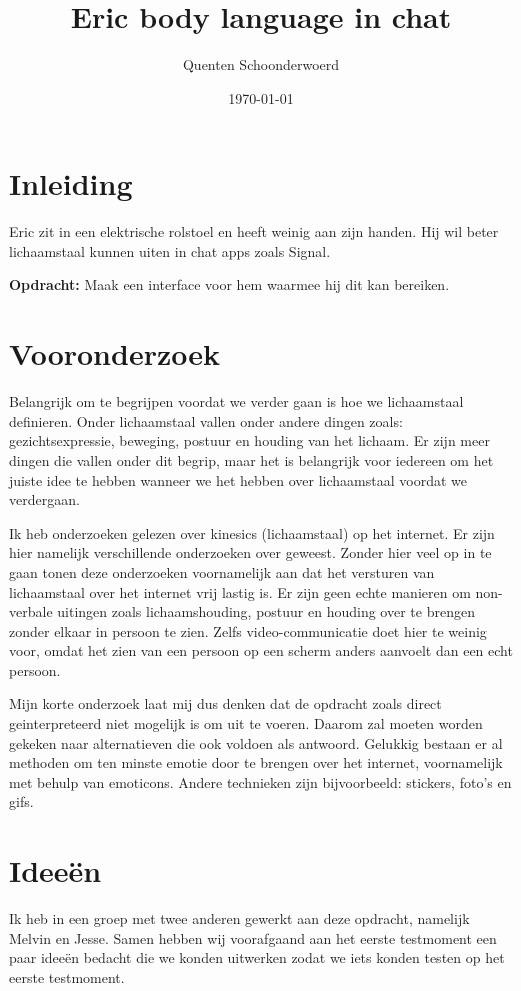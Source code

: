 \documentclass[12pt]{article}
\title{Eric body language in chat}
\author{Quenten Schoonderwoerd}
\date{\today}
\begin{document}
\maketitle

\section{Inleiding}

Eric zit in een elektrische rolstoel en heeft weinig aan zijn handen.
Hij wil beter lichaamstaal kunnen uiten in chat apps zoals Signal.

\textbf{Opdracht:}
Maak een interface voor hem waarmee hij dit kan bereiken.

\section{Vooronderzoek}

Belangrijk om te begrijpen voordat we verder gaan is hoe we lichaamstaal definieren.
Onder lichaamstaal vallen onder andere dingen zoals: gezichtsexpressie, beweging, postuur en houding van het lichaam.
Er zijn meer dingen die vallen onder dit begrip, maar het is belangrijk voor iedereen om het juiste idee te hebben wanneer we het hebben over lichaamstaal voordat we verdergaan.

Ik heb onderzoeken gelezen over kinesics (lichaamstaal) op het internet.
Er zijn hier namelijk verschillende onderzoeken over geweest.
Zonder hier veel op in te gaan tonen deze onderzoeken voornamelijk aan dat het versturen van lichaamstaal over het internet vrij lastig is.
Er zijn geen echte manieren om non-verbale uitingen zoals lichaamshouding, postuur en houding over te brengen zonder elkaar in persoon te zien.
Zelfs video-communicatie doet hier te weinig voor, omdat het zien van een persoon op een scherm anders aanvoelt dan een echt persoon.

Mijn korte onderzoek laat mij dus denken dat de opdracht zoals direct geinterpreteerd niet mogelijk is om uit te voeren.
Daarom zal moeten worden gekeken naar alternatieven die ook voldoen als antwoord.
Gelukkig bestaan er al methoden om ten minste emotie door te brengen over het internet, voornamelijk met behulp van emoticons.
Andere technieken zijn bijvoorbeeld: stickers, foto's en gifs.

\clearpage\section{Ideeën}
Ik heb in een groep met twee anderen gewerkt aan deze opdracht, namelijk Melvin en Jesse.
Samen hebben wij voorafgaand aan het eerste testmoment een paar ideeën bedacht die we konden uitwerken zodat we iets konden testen op het eerste testmoment.
\end{document}
